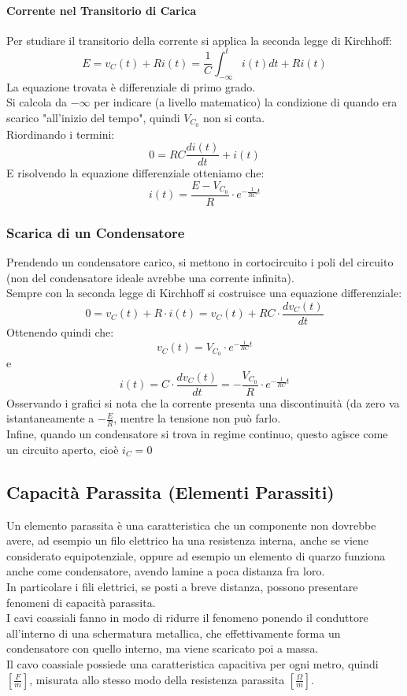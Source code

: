 \documentclass[../main.tex]{subfiles}
\begin{document}
	\paragraph{Corrente nel Transitorio di Carica}
	Per studiare il transitorio della corrente si applica la seconda legge di Kirchhoﬀ:
	\[E=v_C(t)+Ri(t)=\frac{1}{C}\int_{-\infty}^ti(t)dt+Ri(t)\]
	La equazione trovata è diﬀerenziale di primo grado. \\
	Si calcola da $-\infty$ per indicare (a livello matematico) la condizione di quando era scarico "all’inizio del tempo", quindi $V_{C_0}$ non si conta. \\
	Riordinando i termini:
	\[0 = RC\frac{d i(t)}{dt} + i(t)\]
	E risolvendo la equazione diﬀerenziale otteniamo che:
	\begin{equation}
		i(t) = \frac{E-V_{C_0}}{R} \cdot e^{-\frac{1}{RC}t}
	\end{equation}
	\subsubsection{Scarica di un Condensatore}
	Prendendo un condensatore carico, si mettono in cortocircuito i poli del circuito (non del condensatore ideale avrebbe una corrente infinita). \\
	Sempre con la seconda legge di Kirchhoﬀ si costruisce una equazione diﬀerenziale:
	\[0 = v_C(t) + R \cdot i(t) = v_C(t) + RC \cdot \frac{d v_C(t)}{dt}\]
	Ottenendo quindi che:
	\begin{equation}
		v_C(t) = V_{C_0} \cdot e^{-\frac{1}{RC}t}
	\end{equation}
	e
	\begin{equation}
		i(t) = C \cdot \frac{d v_C(t)}{dt} = - \frac{V_{C_0}}{R} \cdot e^{-\frac{1}{RC}t}
	\end{equation}
	Osservando i grafici si nota che la corrente presenta una discontinuità (da zero va istantaneamente a $- \frac{E}{R}$, mentre la tensione non può farlo.\\
	Infine, quando un condensatore si trova in regime continuo, questo agisce come un circuito aperto, cioè $i_C=0$
	\subsection{Capacità Parassita (Elementi Parassiti)}
	Un elemento parassita è una caratteristica che un componente non dovrebbe avere, ad esempio un filo elettrico ha una resistenza interna, anche se viene considerato equipotenziale, oppure ad esempio un elemento di quarzo funziona anche come condensatore, avendo lamine a poca distanza fra loro.\\
	In particolare i fili elettrici, se posti a breve distanza, possono presentare fenomeni di capacità parassita. \\
	I cavi coassiali fanno in modo di ridurre il fenomeno ponendo il conduttore all’interno di una schermatura metallica, che eﬀettivamente forma un condensatore con quello interno, ma viene scaricato poi a massa.\\
	Il cavo coassiale possiede una caratteristica capacitiva per ogni metro, quindi $\left[ \frac{F}{m} \right]$, misurata allo stesso modo della resistenza parassita $\left[ \frac{\Omega}{m}\right]$.
\end{document}
